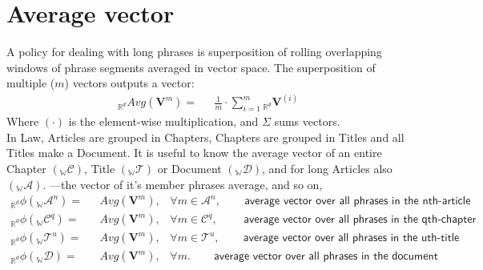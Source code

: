 \documentclass[a4paper,fleqn]{cas-sc}
\begin{document}
\section{Average vector}
A policy for dealing with long phrases is superposition of rolling overlapping windows of 
phrase segments averaged in vector space. The superposition of multiple ($m$) vectors outputs a vector: 
\begin{equation}
  \begin{split}
    {}_{\mathbb{R}^{d}}{Avg}\left(\mathbf{V}^{m}\right) =& \hspace{8pt} \frac{1}{m}\cdot{}\sum_{i=1}^{m} {}_{\mathbb{R}^{d}}\mathbf{V}^{(i)}
  \end{split}
\end{equation}
Where $(\cdot{})$ is the element-wise multiplication, and $\Sigma$ sums vectors. \\
\noindent
In Law, Articles are grouped in Chapters, Chapters are grouped in Titles and all Titles make a Document. 
It is useful to know the average vector of an entire Chapter $({}_{\mathbb{W}}\mathcal{C})$, 
Title $({}_{\mathbb{W}}\mathcal{T})$ or Document $({}_{\mathbb{W}}\mathcal{D})$, 
and for long Articles also $({}_{\mathbb{W}}\mathcal{A})$. 
---the vector of it's member phrases average, and so on, 
\begin{equation}
  \begin{split}
    {}_{\mathbb{R}^d}\phi({}_{\mathbb{W}}\mathcal{A}^{n}) =& \hspace{8pt} {Avg}\left(\mathbf{V}^{m}\right), \hspace{10pt} \forall m \in \mathcal{A}^{n}, \hspace{25pt} \textsf{average vector over all phrases in the nth-article}\\
    {}_{\mathbb{R}^d}\phi({}_{\mathbb{W}}\mathcal{C}^{q}) =& \hspace{8pt} {Avg}\left(\mathbf{V}^{m}\right), \hspace{10pt} \forall m \in \mathcal{C}^{q}, \hspace{28pt} \textsf{average vector over all phrases in the qth-chapter}\\
    {}_{\mathbb{R}^d}\phi({}_{\mathbb{W}}\mathcal{T}^{u}) =& \hspace{8pt} {Avg}\left(\mathbf{V}^{m}\right), \hspace{10pt} \forall m \in \mathcal{T}^{u}, \hspace{25pt} \textsf{average vector over all phrases in the uth-title}\\
    {}_{\mathbb{R}^d}\phi({}_{\mathbb{W}}\mathcal{D}) =& \hspace{8pt} {Avg}\left(\mathbf{V}^{m}\right), \hspace{10pt} \forall m. \hspace{25pt} \textsf{average vector over all phrases in the document}
  \end{split}
\end{equation}
\end{document}
